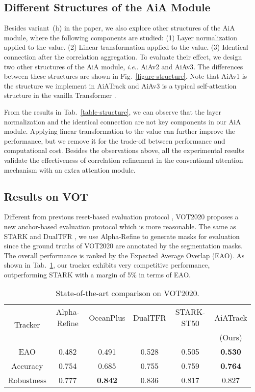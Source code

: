 \documentclass[runningheads]{llncs}
\makeatletter
\DeclareRobustCommand\onedot{\futurelet\@let@token\@onedot}
\def\@onedot{\ifx\@let@token.\else.\null\fi\xspace}
\def\ie{\emph{i.e}\onedot} \def\Ie{\emph{I.e}\onedot}
\makeatother
\begin{document}
\subsection{Different Structures of the AiA Module}
Besides variant~(h) in the paper, we also explore other structures of the AiA module, where the following components are studied: (1) Layer normalization applied to the value. (2) Linear transformation applied to the value. (3) Identical connection after the correlation aggregation. To evaluate their effect, we design two other structures of the AiA module, \ie AiAv2 and AiAv3. The differences between these structures are shown in Fig.~\ref{figure-structure}. Note that AiAv1 is the structure we implement in AiATrack and AiAv3 is a typical self-attention structure in the vanilla Transformer \cite{vaswani2017attention}.

From the results in Tab.~\ref{table-structure}, we can observe that the layer normalization and the identical connection are not key components in our AiA module. Applying linear transformation to the value can further improve the performance, but we remove it for the trade-off between performance and computational cost. Besides the observations above, all the experimental results validate the effectiveness of correlation refinement in the conventional attention mechanism with an extra attention module.

\subsection{Results on VOT}
Different from previous reset-based evaluation protocol \cite{kristan2019seventh}, VOT2020 \cite{kristan2020eighth} proposes a new anchor-based evaluation protocol which is more reasonable. The same as STARK \cite{yan2021learning} and DualTFR \cite{xie2021learning}, we use Alpha-Refine \cite{yan2021alpha} to generate masks for evaluation since the ground truths of VOT2020 are annotated by the segmentation masks. The overall performance is ranked by the Expected Average Overlap (EAO). As shown in Tab.~\ref{table-vot}, our tracker exhibits very competitive performance, outperforming STARK with a margin of 5\% in terms of EAO.

\begin{table}[t]
\centering
\begin{tabular}{c|ccccc}
\hline
\multirow{2}{*}{Tracker}
& Alpha-Refine & OceanPlus & DualTFR & STARK-ST50 & AiATrack \\
& \cite{yan2021alpha} & \cite{zhang2021toward} & \cite{xie2021learning} & \cite{yan2021learning} & (Ours) \\
\hline
EAO & 0.482 & 0.491 & 0.528 & 0.505 & \textbf{0.530} \\
Accuracy & 0.754 & 0.685 & 0.755 & 0.759 & \textbf{0.764} \\
Robustness & 0.777 & \textbf{0.842} & 0.836 & 0.817 & 0.827 \\
\hline
\end{tabular}
\caption{State-of-the-art comparison on VOT2020.}
\label{table-vot}
\end{table}
\end{document}

